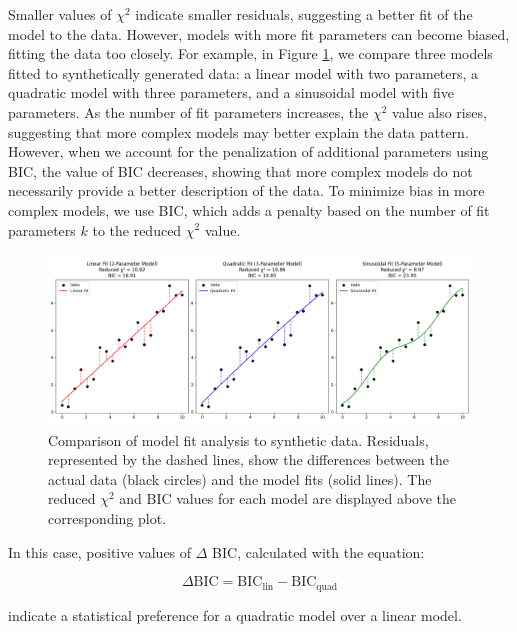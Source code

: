 \documentclass[oneside,12pt]{amsart}
\numberwithin{page}{section}
\begin{document}
Smaller values of $\chi^2$ indicate smaller residuals, suggesting a better fit of the model to the data. However, models with more fit parameters can become biased, fitting the data too closely. For example, in Figure \ref{fig:reduced-chi-squared}, we compare three models fitted to synthetically generated data: a linear model with two parameters, a quadratic model with three parameters, and a sinusoidal model with five parameters. As the number of fit parameters increases, the $\chi^2$ value also rises, suggesting that more complex models may better explain the data pattern. However, when we account for the penalization of additional parameters using BIC, the value of BIC decreases, showing that more complex models do not necessarily provide a better description of the data. To minimize bias in more complex models, we use BIC, which adds a penalty based on the number of fit parameters $k$ to the reduced $\chi^2$ value.

\begin{figure}[htbp]
    \centering
    \includegraphics[width=\linewidth]{figs/reduced_chi_squared.png}
    \caption{Comparison of model fit analysis to synthetic data. Residuals, represented by the dashed lines, show the differences between the actual data (black circles) and the model fits (solid lines). The reduced $\chi^2$ and BIC values for each model are displayed above the corresponding plot.}
    \label{fig:reduced-chi-squared}
\end{figure}

In this case, positive values of $\Delta$ BIC, calculated with the equation:

\begin{equation}
    \Delta \text{BIC} = \text{BIC}_{\text{lin}} - \text{BIC}_{\text{quad}}
\end{equation}

indicate a statistical preference for a quadratic model over a linear model.
\end{document}
